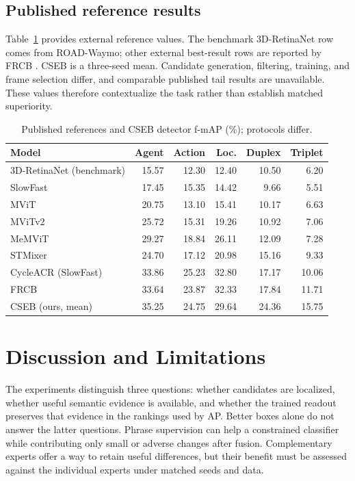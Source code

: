 \documentclass[11pt,letterpaper]{article}
\begin{document}
\subsection{Published reference results}
Table~\ref{tab:published} provides external reference values. The benchmark 3D-RetinaNet row comes from ROAD-Waymo; other external best-result rows are reported by FRCB \cite{road-waymo,frcb}. CSEB is a three-seed mean. Candidate generation, filtering, training, and frame selection differ, and comparable published tail results are unavailable. These values therefore contextualize the task rather than establish matched superiority.
\begin{table}[htbp]
\centering
\caption{Published references and CSEB detector f-mAP (\%); protocols differ.}
\label{tab:published}
\begin{singlespace}
\begin{tabularx}{\textwidth}{@{}Xrrrrr@{}}
\toprule
\textbf{Model} & \textbf{Agent} & \textbf{Action} & \textbf{Loc.} & \textbf{Duplex} & \textbf{Triplet} \\
\midrule
3D-RetinaNet (benchmark) & 15.57 & 12.30 & 12.40 & 10.50 & 6.20 \\
SlowFast & 17.45 & 15.35 & 14.42 & 9.66 & 5.51 \\
MViT & 20.75 & 13.10 & 15.41 & 10.17 & 6.63 \\
MViTv2 & 25.72 & 15.31 & 19.26 & 10.92 & 7.06 \\
MeMViT & 29.27 & 18.84 & 26.11 & 12.09 & 7.28 \\
STMixer & 24.70 & 17.12 & 20.98 & 15.16 & 9.33 \\
CycleACR (SlowFast) & 33.86 & 25.23 & 32.80 & 17.17 & 10.06 \\
FRCB & 33.64 & 23.87 & 32.33 & 17.84 & 11.71 \\
CSEB (ours, mean) & 35.25 & 24.75 & 29.64 & 24.36 & 15.75 \\
\bottomrule
\end{tabularx}
\end{singlespace}
\end{table}

\section{Discussion and Limitations}
The experiments distinguish three questions: whether candidates are localized, whether useful semantic evidence is available, and whether the trained readout preserves that evidence in the rankings used by AP. Better boxes alone do not answer the latter questions. Phrase supervision can help a constrained classifier while contributing only small or adverse changes after fusion. Complementary experts offer a way to retain useful differences, but their benefit must be assessed against the individual experts under matched seeds and data.
\end{document}
